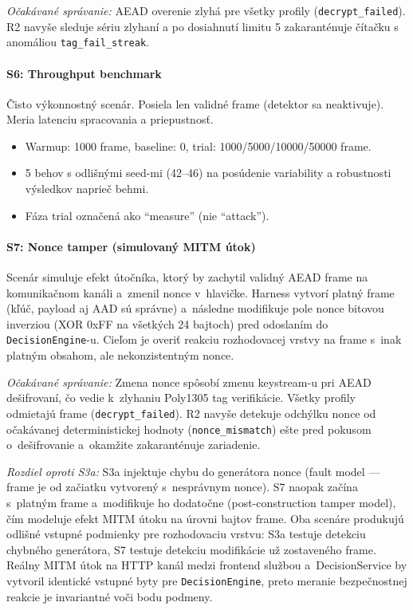 \textit{Očakávané správanie:} AEAD overenie zlyhá pre všetky profily (\texttt{decrypt\_failed}). R2 navyše sleduje sériu zlyhaní a po dosiahnutí limitu 5 zakaranténuje čítačku s anomáliou \texttt{tag\_fail\_streak}.

\paragraph{S6: Throughput benchmark}

Čisto výkonnostný scenár. Posiela len validné frame (detektor sa neaktivuje). Meria latenciu spracovania a priepustnosť.

\begin{itemize}[leftmargin=*,itemsep=2pt]
  \item Warmup: 1000 frame, baseline: 0, trial: 1000/5000/10000/50000 frame.
  \item 5 behov s odlišnými seed-mi (42--46) na posúdenie variability a robustnosti výsledkov naprieč behmi.
  \item Fáza trial označená ako ``measure'' (nie ``attack'').
\end{itemize}

\paragraph{S7: Nonce tamper (simulovaný MITM útok)}

Scenár simuluje efekt útočníka, ktorý by zachytil validný AEAD frame na komunikačnom kanáli a~zmenil nonce v~hlavičke. Harness vytvorí platný frame (kľúč, payload aj AAD sú správne) a~následne modifikuje pole nonce bitovou inverziou (XOR 0xFF na všetkých 24 bajtoch) pred odoslaním do \texttt{DecisionEngine}-u. Cieľom je overiť reakciu rozhodovacej vrstvy na frame s~inak platným obsahom, ale nekonzistentným nonce.

\textit{Očakávané správanie:} Zmena nonce spôsobí zmenu keystream-u pri AEAD dešifrovaní, čo vedie k~zlyhaniu Poly1305 tag verifikácie. Všetky profily odmietajú frame (\texttt{decrypt\_failed}). R2 navyše detekuje odchýlku nonce od očakávanej deterministickej hodnoty (\texttt{nonce\_mismatch}) ešte pred pokusom o~dešifrovanie a~okamžite zakaranténuje zariadenie.

\textit{Rozdiel oproti S3a:} S3a injektuje chybu do generátora nonce (fault model --- frame je od začiatku vytvorený s~nesprávnym nonce). S7 naopak začína s~platným frame a~modifikuje ho dodatočne (post-construction tamper model), čím modeluje efekt MITM útoku na úrovni bajtov frame. Oba scenáre produkujú odlišné vstupné podmienky pre rozhodovaciu vrstvu: S3a testuje detekciu chybného generátora, S7 testuje detekciu modifikácie už zostaveného frame. Reálny MITM útok na HTTP kanál medzi frontend službou a~DecisionService by vytvoril identické vstupné byty pre \texttt{DecisionEngine}, preto meranie bezpečnostnej reakcie je invariantné voči bodu podmeny.

